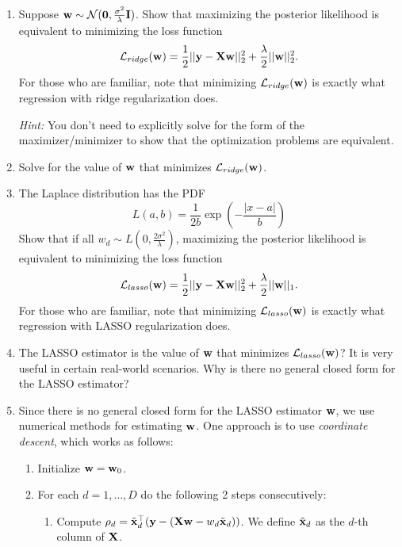 \documentclass[submit]{../harvardml}
\begin{document}
\begin{problem}
    \begin{enumerate}
        \item Suppose $\mathbf{w} \sim \mathcal{N}(\mathbf{0},\frac{\sigma^2}{\lambda}\mathbf{I})$. Show that maximizing the posterior likelihood is equivalent to minimizing the loss function
        \[\mathcal{L}_{ridge}(\mathbf{w}) = \frac{1}{2}||\mathbf{y} -\bold X\mathbf{w}||_2^2 + \frac{\lambda}{2}||\mathbf{w}||_2^2.\] 
        For those who are familiar, note that minimizing $\mathcal{L}_{ridge}(\mathbf{w})$ is exactly what regression with ridge regularization does.
        
        \textit{Hint:} You don't need to explicitly solve for the form of the maximizer/minimizer to show that the optimization problems are equivalent.
        
        \item Solve for the value of $\mathbf{w}$ that minimizes $\mathcal L_{ridge}(\mathbf{w})$.
    
        \item The Laplace distribution has the PDF
       \[L(a,b) =\frac{1}{2b} \exp\left(-\frac{|x - a|}{b}\right)\]
        Show that if all $w_d \sim L\left(0,\frac{2\sigma^2}{\lambda}\right)$, maximizing the posterior likelihood is equivalent to minimizing the loss function
        \[\mathcal{L}_{lasso}(\mathbf{w}) = \frac{1}{2}||\mathbf{y} -\bold X\mathbf{w}||_2^2  + \frac{\lambda}{2}||\mathbf{w}||_1.\] 
        For those who are familiar, note that minimizing $\mathcal{L}_{lasso}(\mathbf{w})$ is exactly what regression with LASSO regularization does.
    
        \item The LASSO estimator is the value of $\mathbf{w}$ that minimizes $\mathcal{L}_{lasso}(\mathbf{w})$? It is very useful in certain real-world scenarios. Why is there no general closed form for the LASSO estimator?
    
        \item Since there is no general closed form for the LASSO estimator $\mathbf{w}$, we use numerical methods for estimating $\mathbf{w}$. One approach is to use \textit{coordinate descent}, which works as follows: 
        \begin{enumerate}
            \item Initialize $\mathbf{w}=\mathbf{w}_0$.
            \item For each $d=1, \ldots, D$ do the following 2 steps consecutively:
            \begin{enumerate}
                \item Compute $\rho_d = \tilde{\mathbf{x}}_d^\top(\mathbf{y} - (\mathbf{X} \mathbf{w} - w_d \tilde{\mathbf{x}}_d))$. We define $\tilde{\mathbf{x}}_d$ as the $d$-th column of $\mathbf{X}$.
    

\end{enumerate}
\end{enumerate}
\end{enumerate}
\end{problem}
\end{document}
